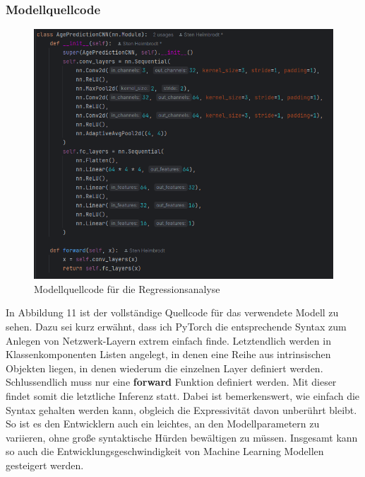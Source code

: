 \subsubsection{Modellquellcode}
\begin{figure}
    \centering
    \includegraphics[width=0.9\linewidth]{Screenshot 2025-03-30 164658.png}
    \caption{Modellquellcode für die Regressionsanalyse}
    \label{fig:enter-label}
\end{figure}
In Abbildung 11 ist der vollständige Quellcode für das verwendete Modell zu sehen. Dazu sei kurz erwähnt, dass ich PyTorch die entsprechende Syntax zum Anlegen von Netzwerk-Layern extrem einfach finde. Letztendlich werden in Klassenkomponenten Listen angelegt, in denen eine Reihe aus intrinsischen Objekten liegen, in denen wiederum die einzelnen Layer definiert werden. Schlussendlich muss nur eine \textbf{forward} Funktion definiert werden. Mit dieser findet somit die letztliche Inferenz statt. Dabei ist bemerkenswert, wie einfach die Syntax gehalten werden kann, obgleich die Expressivität davon unberührt bleibt. So ist es den Entwicklern auch ein leichtes, an den Modellparametern zu variieren, ohne große syntaktische Hürden bewältigen zu müssen. Insgesamt kann so auch die Entwicklungsgeschwindigkeit von Machine Learning Modellen gesteigert werden.

